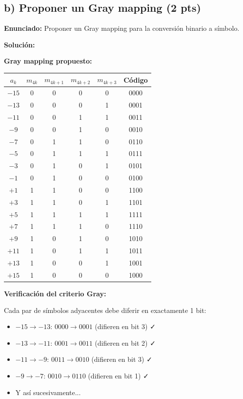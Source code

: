 \documentclass[11pt,a4paper]{article}
\begin{document}
\subsection*{b) Proponer un Gray mapping (2 pts)}

\textbf{Enunciado:} Proponer un Gray mapping para la conversi\'on binario a s\'imbolo.

\vspace{0.3cm}
\textbf{Soluci\'on:}

\textbf{Gray mapping propuesto:}

\begin{center}
\begin{tabular}{|c|c|c|c|c|c|}
\hline
\textbf{$a_k$} & \textbf{$m_{4k}$} & \textbf{$m_{4k+1}$} & \textbf{$m_{4k+2}$} & \textbf{$m_{4k+3}$} & \textbf{C\'odigo} \\
\hline
$-15$ & 0 & 0 & 0 & 0 & 0000 \\
$-13$ & 0 & 0 & 0 & 1 & 0001 \\
$-11$ & 0 & 0 & 1 & 1 & 0011 \\
$-9$ & 0 & 0 & 1 & 0 & 0010 \\
$-7$ & 0 & 1 & 1 & 0 & 0110 \\
$-5$ & 0 & 1 & 1 & 1 & 0111 \\
$-3$ & 0 & 1 & 0 & 1 & 0101 \\
$-1$ & 0 & 1 & 0 & 0 & 0100 \\
$+1$ & 1 & 1 & 0 & 0 & 1100 \\
$+3$ & 1 & 1 & 0 & 1 & 1101 \\
$+5$ & 1 & 1 & 1 & 1 & 1111 \\
$+7$ & 1 & 1 & 1 & 0 & 1110 \\
$+9$ & 1 & 0 & 1 & 0 & 1010 \\
$+11$ & 1 & 0 & 1 & 1 & 1011 \\
$+13$ & 1 & 0 & 0 & 1 & 1001 \\
$+15$ & 1 & 0 & 0 & 0 & 1000 \\
\hline
\end{tabular}
\end{center}

\textbf{Verificaci\'on del criterio Gray:}

Cada par de s\'imbolos adyacentes debe diferir en exactamente 1 bit:
\begin{itemize}
    \item $-15 \rightarrow -13$: $0000 \rightarrow 0001$ (difieren en bit 3) ✓
    \item $-13 \rightarrow -11$: $0001 \rightarrow 0011$ (difieren en bit 2) ✓
    \item $-11 \rightarrow -9$: $0011 \rightarrow 0010$ (difieren en bit 3) ✓
    \item $-9 \rightarrow -7$: $0010 \rightarrow 0110$ (difieren en bit 1) ✓
    \item Y as\'i sucesivamente...
\end{itemize}
\end{document}

